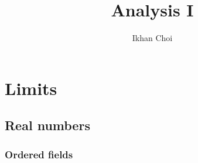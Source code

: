 \documentclass{../../large}
\begin{document}
\title{Analysis I}
\author{Ikhan Choi}
\maketitle





\tableofcontents


\part{Limits}
\chapter{Real numbers}

\section{Ordered fields}
\end{document}
